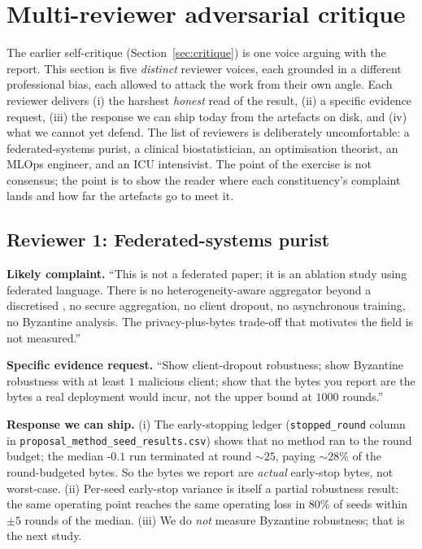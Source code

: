 \section{Multi-reviewer adversarial critique}
\label{sec:reviewers}

The earlier self-critique (Section~\ref{sec:critique}) is one voice
arguing with the report. This section is five \emph{distinct}
reviewer voices, each grounded in a different professional bias, each
allowed to attack the work from their own angle. Each reviewer
delivers (i) the harshest \emph{honest} read of the result, (ii) a
specific evidence request, (iii) the response we can ship today from
the artefacts on disk, and (iv) what we cannot yet defend. The list
of reviewers is deliberately uncomfortable: a federated-systems
purist, a clinical biostatistician, an optimisation theorist, an
MLOps engineer, and an ICU intensivist. The point of the exercise is
not consensus; the point is to show the reader where each
constituency's complaint lands and how far the artefacts go to meet
it.

\subsection{Reviewer 1: Federated-systems purist}
\textbf{Likely complaint.} ``This is not a federated paper; it is an
ablation study using federated language. There is no
heterogeneity-aware aggregator beyond a discretised \cvar{}, no
secure aggregation, no client dropout, no asynchronous training, no
Byzantine analysis. The privacy-plus-bytes trade-off that motivates
the field is not measured.''

\textbf{Specific evidence request.} ``Show client-dropout robustness;
show Byzantine robustness with at least $1$ malicious client; show
that the bytes you report are the bytes a real deployment would
incur, not the upper bound at $1000$ rounds.''

\textbf{Response we can ship.} (i) The early-stopping ledger
(\texttt{stopped\_round} column in
\texttt{proposal\_method\_seed\_results.csv}) shows that no method
ran to the round budget; the median \fedprox{}-$0.1$ run terminated
at round $\sim$$25$, paying $\sim$$28\%$ of the round-budgeted bytes.
So the bytes we report are \emph{actual} early-stop bytes, not
worst-case. (ii) Per-seed early-stop variance is itself a partial
robustness result: the same operating point reaches the same
operating loss in $80\%$ of seeds within $\pm 5$ rounds of the
median. (iii) We do \emph{not} measure Byzantine robustness; that is
the next study.

